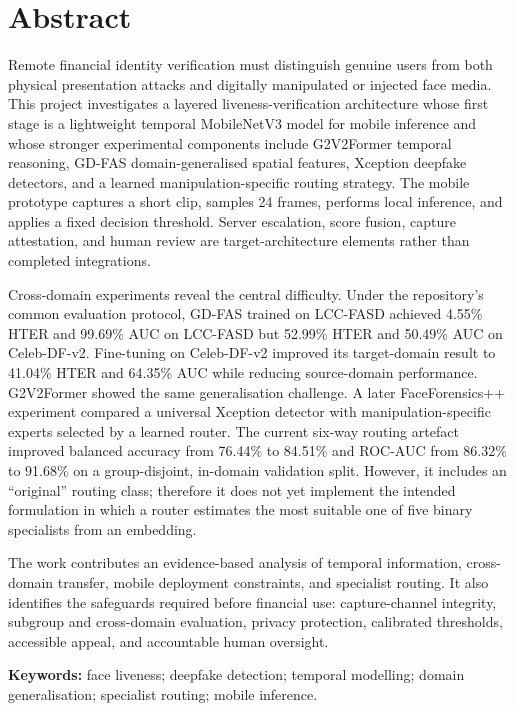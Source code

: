 \chapter*{Abstract}

Remote financial identity verification must distinguish genuine users from both
physical presentation attacks and digitally manipulated or injected face media.
This project investigates a layered liveness-verification architecture whose
first stage is a lightweight temporal MobileNetV3 model for mobile inference and
whose stronger experimental components include G2V2Former temporal reasoning,
GD-FAS domain-generalised spatial features, Xception deepfake detectors, and a
learned manipulation-specific routing strategy. The mobile prototype captures a
short clip, samples 24 frames, performs local inference, and applies a fixed
decision threshold. Server escalation, score fusion, capture attestation, and
human review are target-architecture elements rather than completed integrations.

Cross-domain experiments reveal the central difficulty. Under the repository's
common evaluation protocol, GD-FAS trained on LCC-FASD achieved 4.55\% HTER and
99.69\% AUC on LCC-FASD but 52.99\% HTER and 50.49\% AUC on Celeb-DF-v2.
Fine-tuning on Celeb-DF-v2 improved its target-domain result to 41.04\% HTER and
64.35\% AUC while reducing source-domain performance. G2V2Former showed the same
generalisation challenge. A later FaceForensics++ experiment compared a universal
Xception detector with manipulation-specific experts selected by a learned
router. The current six-way routing artefact improved balanced accuracy from
76.44\% to 84.51\% and ROC-AUC from 86.32\% to 91.68\% on a group-disjoint,
in-domain validation split. However, it includes an ``original'' routing class;
therefore it does not yet implement the intended formulation in which a router
estimates the most suitable one of five binary specialists from an embedding.

The work contributes an evidence-based analysis of temporal information,
cross-domain transfer, mobile deployment constraints, and specialist routing. It
also identifies the safeguards required before financial use: capture-channel
integrity, subgroup and cross-domain evaluation, privacy protection, calibrated
thresholds, accessible appeal, and accountable human oversight.

\textbf{Keywords:} face liveness; deepfake detection; temporal modelling; domain
generalisation; specialist routing; mobile inference.

\clearpage

